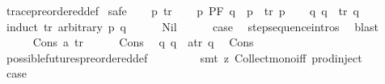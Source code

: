 \begin{isabellebody}
\ trace{\isacharunderscore}{\kern0pt}preordered{\isacharunderscore}{\kern0pt}def\isanewline
{}\isamarkupfalse%
\ safe\isanewline
\ \ \isamarkupfalse%
\ p{\isacharprime}{\kern0pt}{\isacharprime}{\kern0pt}\ tr\isanewline
\ \ \isamarkupfalse%
\ {\isacartoucheopen}p\ {\isasymlesssim}PF\ q{\isacartoucheclose}\ \ {\isacartoucheopen}p\ {\isasymmapsto}{\isachardollar}{\kern0pt}\ tr\ p{\isacharprime}{\kern0pt}{\isacharprime}{\kern0pt}{\isacartoucheclose}\isanewline
\ \ \isamarkupfalse%
\ {\isacartoucheopen}{\isasymexists}q{\isacharprime}{\kern0pt}{\isachardot}{\kern0pt}\ q\ {\isasymmapsto}{\isachardollar}{\kern0pt}\ tr\ q{\isacharprime}{\kern0pt}{\isacartoucheclose}\isanewline
\ \ \isamarkupfalse%
\ {\isacharparenleft}{\kern0pt}induct\ tr\ arbitrary{\isacharcolon}{\kern0pt}\ p\ q{\isacharparenright}{\kern0pt}\isanewline
\ \ \ \ \isamarkupfalse%
\ Nil\isanewline
\ \ \ \ \isamarkupfalse%
\ {\isacharquery}{\kern0pt}case\ \isamarkupfalse%
\ step{\isacharunderscore}{\kern0pt}sequence{\isachardot}{\kern0pt}intros{\isacharparenleft}{\kern0pt}{}{\isacharparenright}{\kern0pt}\ \isamarkupfalse%
\ blast\isanewline
\ \ \isamarkupfalse%
\isanewline
\ \ \ \ \isamarkupfalse%
\ {\isacharparenleft}{\kern0pt}Cons\ a\ tr{\isacharparenright}{\kern0pt}\isanewline
\ \ \ \ \isamarkupfalse%
\ Cons\ \isamarkupfalse%
\ {\isachardoublequoteopen}{\isasymexists}q{\isacharprime}{\kern0pt}{\isacharprime}{\kern0pt}{\isachardot}{\kern0pt}\ q\ {\isasymmapsto}{\isachardollar}{\kern0pt}\ {\isacharparenleft}{\kern0pt}a{\isacharhash}{\kern0pt}tr{\isacharparenright}{\kern0pt}\ q{\isacharprime}{\kern0pt}{\isacharprime}{\kern0pt}{\isachardoublequoteclose}\ \isamarkupfalse%
\ Cons{\isacharparenleft}{\kern0pt}{}{\isacharparenright}{\kern0pt}\ \isanewline
\ \ \ \ \ \ \isamarkupfalse%
\ possible{\isacharunderscore}{\kern0pt}futures{\isacharunderscore}{\kern0pt}preordered{\isacharunderscore}{\kern0pt}def\ \isanewline
\ \ \ \ \ \ \isamarkupfalse%
\ {\isacharparenleft}{\kern0pt}smt\ {\isacharparenleft}{\kern0pt}z{}{\isacharparenright}{\kern0pt}\ Collect{\isacharunderscore}{\kern0pt}mono{\isacharunderscore}{\kern0pt}iff\ prod{\isachardot}{\kern0pt}inject{\isacharparenright}{\kern0pt}\isanewline
\ \ \ \ \isamarkupfalse%
\ \isamarkupfalse%
\ {\isacharquery}{\kern0pt}case\ \isanewline

\end{isabellebody}
